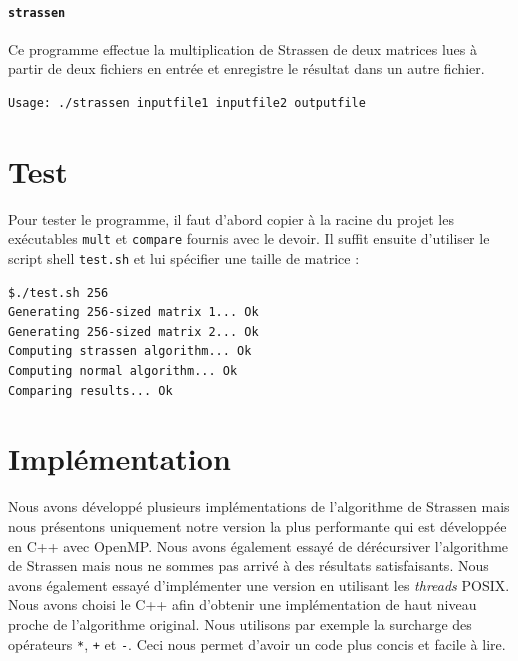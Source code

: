 \documentclass[a4paper, 12pt]{article}
\begin{document}
\paragraph{\texttt{strassen}}

Ce programme effectue la multiplication de Strassen de deux matrices
lues à partir de deux fichiers en entrée et enregistre le résultat
dans un autre fichier.

\begin{lstlisting}
Usage: ./strassen inputfile1 inputfile2 outputfile 
\end{lstlisting}

\pagebreak

\section{Test}

Pour tester le programme, il faut d'abord copier à la racine du projet
les exécutables \texttt{mult} et \texttt{compare} fournis avec le
devoir. Il suffit ensuite d'utiliser le script shell \texttt{test.sh}
et lui spécifier une taille de matrice :

\begin{lstlisting}
$./test.sh 256
Generating 256-sized matrix 1... Ok
Generating 256-sized matrix 2... Ok
Computing strassen algorithm... Ok
Computing normal algorithm... Ok
Comparing results... Ok
\end{lstlisting}

\section{Implémentation}

Nous avons développé plusieurs implémentations de l'algorithme de
Strassen mais nous présentons uniquement notre version la plus
performante qui est développée en C++ avec OpenMP. Nous avons
également essayé de dérécursiver l'algorithme de Strassen mais nous ne
sommes pas arrivé à des résultats satisfaisants. Nous avons également
essayé d'implémenter une version en utilisant les \textit{threads} POSIX. \\

Nous avons choisi le C++ afin d'obtenir une implémentation de haut
niveau proche de l'algorithme original. Nous utilisons par exemple la
surcharge des opérateurs \texttt{*}, \texttt{+} et \texttt{-}. Ceci
nous permet d'avoir un code plus concis et facile à lire. \\
\end{document}
